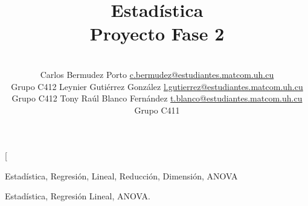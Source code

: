 \documentclass[a4paper,10pt,twocolumn]{article}
\title{Estadística\\Proyecto Fase 2}
\author{\\
\name Carlos Bermudez Porto \email \href{mailto:c.bermudez@estudiantes.matcom.uh.cu}{c.bermudez@estudiantes.matcom.uh.cu}
	\\ \addr Grupo C412 \AND
\name Leynier Gutiérrez González \email \href{mailto:l.gutierrez@estudiantes.matcom.uh.cu}{l.gutierrez@estudiantes.matcom.uh.cu}
  \\ \addr Grupo C412 \AND
\name Tony Raúl Blanco Fernández \email \href{mailto:t.blanco@estudiantes.matcom.uh.cu}{t.blanco@estudiantes.matcom.uh.cu}
  \\ \addr Grupo C411}
\begin{document}
\twocolumn[

\maketitle









\begin{keywords}
	Estadística,
	Regresión,
	Lineal,
	Reducción,
	Dimensión,
	ANOVA
\end{keywords}

\begin{topics}
	Estadística, Regresión Lineal, ANOVA.
\end{topics}
\end{document}

